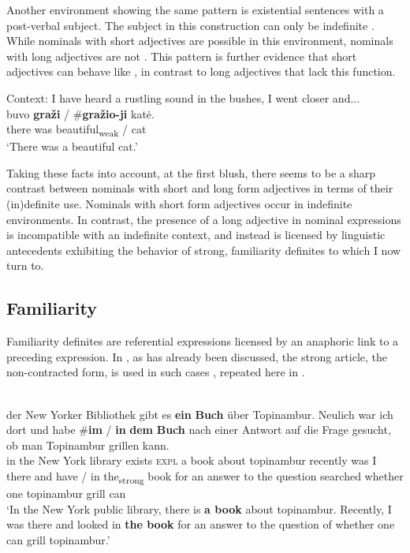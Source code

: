 \documentclass[output=paper,
modfonts
]{langscibook}
\begin{document}
Another environment showing the same pattern is existential sentences with a post-verbal subject. The subject in this construction can only be indefinite \citep{GillonArmoskaite2015}. While nominals with short adjectives are possible in this environment, nominals with long adjectives are not . This pattern is further evidence that short adjectives can behave like , in contrast to long adjectives that lack this function. 

\begin{exe}
\ex \label{ex:sereikaite:34}
Context: I have heard a rustling sound in the bushes, I went closer and...\\
 {buvo} \textbf{graži} \textnormal{/} \textnormal{\#}\textbf{gražio-ji} {katė.} \\
there was {beautiful\textsubscript{weak}} /  cat\\
\trans `There was a beautiful cat.'  
\end{exe}

Taking these facts into account, at the first blush, there seems to be a sharp contrast between nominals with short and long form adjectives in terms of their (in)definite use. Nominals with short form adjectives occur in indefinite environments. In contrast, the presence of a long adjective in nominal expressions is incompatible with an indefinite context, and instead is licensed by linguistic antecedents exhibiting the behavior of strong, familiarity definites to which I now turn to.

\subsection{Familiarity}
Familiarity definites are referential expressions licensed by an anaphoric link to a preceding expression. In , as has already been discussed, the strong article, the non-contracted form, is used in such cases , repeated here in .

\begin{exe}
	\ex \label{ex:sereikaite:35}
	 \citep[30]{Schwarz2009} \\
	 {der} {New} {Yorker} {Bibliothek} {gibt} {es} \textbf{{ein}} \textbf{{Buch}} {über} {Topinambur}. {Neulich} {war} {ich} {dort} {und} {habe} \textnormal{\#}\textbf{im} \textnormal{/} \textbf{in} \textbf{dem} \textbf{{Buch}} {nach} {einer} {Antwort} {auf} {die} {Frage} {gesucht}, {ob} {man} {Topinambur} {grillen} {kann}.\\
	in the New York library exists \textsc{expl} {a} {book} about topinambur recently was I there and have  / {in} the\textsubscript{strong} {book} for an answer to the question searched whether one topinambur grill can\\
	\trans `In the New York public library, there is \textbf{a book} about topinambur. Recently, I was there and looked in \textbf{the	book} for an answer to the question of whether one can grill topinambur.’ 
\end{exe}
\end{document}
